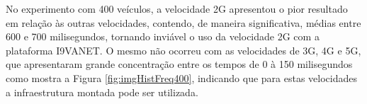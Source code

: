 \documentclass[
	12pt,				%
	oneside,			%
	a4paper,			%
	english,			%
	brazil				%
	]{abntex2ppgsi}
\begin{document}
\begin{figure}[h!]
{		\label{fig:imgGraficoFreq4g200}
	}	
\end{figure}

No experimento com 400 veículos,  a velocidade 2G apresentou o pior resultado em relação às outras velocidades, contendo, de maneira significativa, médias entre 600 e 700 milisegundos, tornando inviável o uso da velocidade 2G com a plataforma I9VANET. O mesmo não ocorreu  com as velocidades de 3G, 4G e 5G, que apresentaram grande concentração entre os tempos de 0 à 150 milisegundos como mostra a Figura \ref{fig:imgHistFreq400}, indicando que para estas velocidades a infraestrutura montada pode ser utilizada.
\end{document}
